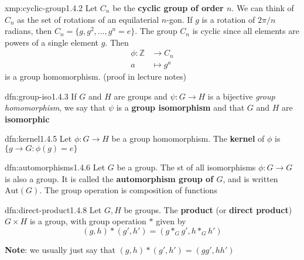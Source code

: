 \documentclass{article}
\begin{document}
\begin{xmp}{xmp:cyclic-group}{1.4.2}
    Let $C_{n}$ be the \textbf{cyclic group of order $n$}. We can think of $C_{n}$ as the set of rotations of an equilaterial $n$-gon. If $g$ is a rotation of $2\pi / n$ radians, then $C_{n} = \{g, g^{2},\dots,g^{n} = e\}$. The group $C_{n}$ is cyclic since all elements are powers of a single element $g$. Then
    \begin{align*}
        \phi : \mathbb{Z} &\to C_{n}\\
        a & \mapsto g^{a}
    \end{align*}
    is a group homomorphism. (proof in lecture notes)
\end{xmp}

\begin{dfn}{dfn:group-iso}{1.4.3}
    If $G$ and $H$ are groups and $\psi : G \to H$ is a bijective \textit{group homomorphism}, we say that $\psi$ is a \textbf{group isomorphism} and that $G$ and $H$ are \textbf{isomorphic}
\end{dfn}

\begin{dfn}{dfn:kernel}{1.4.5}
    Let $\phi : G \to H$ be a group homomorphism. The \textbf{kernel} of $\phi$ is $\{g \to G : \phi(g) = e\}$
\end{dfn}

\begin{dfn}[Automorphisms]{dfn:automorphisms}{1.4.6}
    Let $G$ be a group. The st of all isomorphisms $\phi : G \to G$ is also a group. It is called the \textbf{automorphism group of $G$}, and is written $\mathrm{Aut}(G)$. The group operation is composition of functions
\end{dfn}

\begin{dfn}{dfn:direct-product}{1.4.8}
    Let $G, H$ be groups. The \textbf{product} (or \textbf{direct product}) $G \times H$ is a group, with group operation $*$ given by
    \[(g, h) * (g', h') = (g *_{G} g', h *_{G} h')\]

    \textbf{Note}: we usually just say that $(g, h) * (g', h') = (gg', hh')$
\end{dfn}
\end{document}
